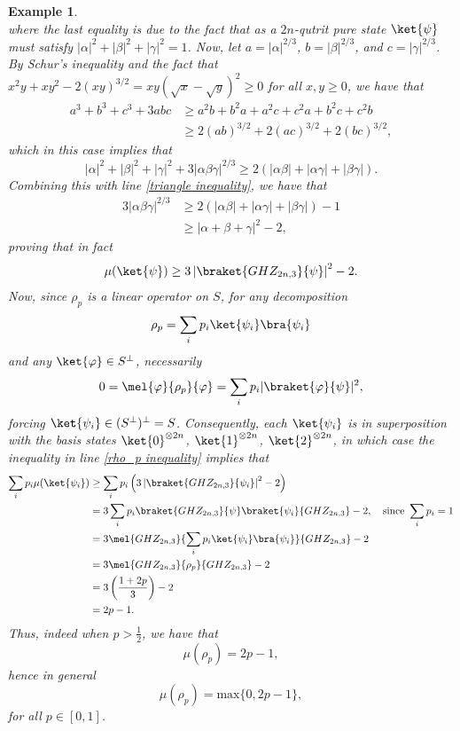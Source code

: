 \documentclass{article}
\newtheorem{eg}{Example}
\begin{document}
\begin{eg}
\begin{equation}
    \end{equation}
    where the last equality is due to the fact that as a $2n$-qutrit pure state $\ket{\psi}$ must satisfy $|\alpha|^2+|\beta|^2+|\gamma|^2=1$. Now, let $a = |\alpha|^{2/3}$, $b = |\beta|^{2/3}$, and $c = |\gamma|^{2/3}$. By Schur's inequality and the fact that $x^2y+xy^2-2(xy)^{3/2} = xy(\sqrt{x}-\sqrt{y})^2\geq 0$ for all $x,y\geq 0$, we have that 
    \begin{align*}
        a^3+b^3+c^3+3abc &\geq a^2b+b^2a+a^2c+c^2a+b^2c+c^2b \\
        &\geq 2(ab)^{3/2}+2(ac)^{3/2}+2(bc)^{3/2},
    \end{align*}
    which in this case implies that  
    \[|\alpha|^2+|\beta|^2+|\gamma|^2 + 3|\alpha\beta\gamma|^{2/3}\geq 2(|\alpha\beta|+|\alpha\gamma|+|\beta\gamma|).\]
    Combining this with line \eqref{triangle inequality}, we have that 
    \begin{align*}
        3|\alpha\beta\gamma|^{2/3} &\geq 2(|\alpha\beta|+|\alpha\gamma|+|\beta\gamma|)-1 \\
        &\geq |\alpha+\beta+\gamma|^2-2,
    \end{align*}
    proving that in fact 
    \begin{equation}\label{rho_p inequality}
        \mu(\ket{\psi})\geq 3\left|\braket{GHZ_{2n,3}}{\psi}\right|^2-2.
    \end{equation}
    Now, since $\rho_p$ is a linear operator on $S$, for any decomposition 
    \[\rho_p = \sum\limits_ip_i\ket{\psi_i}\bra{\psi_i}\]
    and any $\ket{\varphi}\in S^{\perp}$, necessarily
    \[0 = \mel{\varphi}{\rho_p}{\varphi} = \sum\limits_ip_i|\braket{\varphi}{\psi}|^2,\]
    forcing $\ket{\psi_i}\in (S^{\perp})^{\perp} = S$. Consequently, each $\ket{\psi_i}$ is in superposition with the basis states $\ket{0}^{\otimes 2n}$, $\ket{1}^{\otimes 2n}$, $\ket{2}^{\otimes 2n}$, in which case the inequality in line \eqref{rho_p inequality} implies that 
    \begin{align*}
        \sum\limits_ip_i\mu(\ket{\psi_i}) &\geq \sum\limits_ip_i\left(3\left|\braket{GHZ_{2n,3}}{\psi_i}\right|^2-2\right) \\
        &= 3\sum\limits_ip_i\braket{GHZ_{2n,3}}{\psi}\braket{\psi_i}{GHZ_{2n,3}} - 2,\quad \text{since }\sum\limits_ip_i=1 \\
        &= 3\mel{GHZ_{2n,3}}{\sum\limits_ip_i\ket{\psi_i}\bra{\psi_i}}{GHZ_{2n,3}}-2 \\
        &= 3\mel{GHZ_{2n,3}}{\rho_p}{GHZ_{2n,3}}-2 \\
        &= 3\left(\frac{1+2p}{3}\right)-2 \\
        &= 2p-1.
    \end{align*}
    Thus, indeed when $p>\frac{1}{2}$, we have that 
    \[\mu(\rho_p) = 2p-1,\]
    hence in general
    \[\mu(\rho_p) = \mathrm{max}\{0,2p-1\},\]
    for all $p\in [0,1]$. 
\end{eg}
\end{document}
